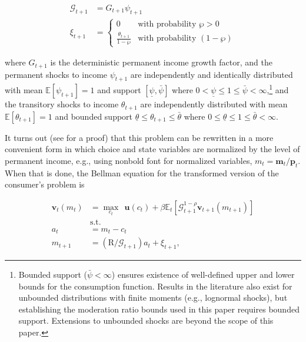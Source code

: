 \documentclass[twocolumn, switch]{article}
\newcommand{\Ex}{\mathbf{\mathbb{E}}}
\newcommand{\DiscFac}{\beta}
\newcommand{\uFunc}{\mathbf{u}}
\newcommand{\CRRA}{\rho}
\newcommand{\cNrm}{c}
\newcommand{\Rfree}{\text{R}}
\newcommand{\PermGroShk}{\mathcal{G}}
\newcommand{\tranShk}{\xi}
\newcommand{\mLvl}{\mathbf{m}}
\newcommand{\pLvl}{\mathbf{p}}
\newcommand{\PermGroFac}{G}
\newcommand{\permShk}{\psi}
\newcommand{\tranShkEmp}{\theta}
\newcommand{\WorstProb}{\wp}
\newcommand{\permShkMin}{\underline{\permShk}}
\newcommand{\permShkMax}{\bar{\permShk}}
\newcommand{\tranShkEmpMin}{\underline{\tranShkEmp}}
\newcommand{\tranShkEmpMax}{\bar{\tranShkEmp}}
\newcommand{\mNrm}{m}
\newcommand{\aNrm}{a}
\newcommand{\vFunc}{\mathbf{v}}
\begin{document}
\begin{equation}
\label{eq:ExogVars}
\begin{aligned}
\PermGroShk_{t+1} &= \PermGroFac_{t+1} \permShk_{t+1}  \\
\tranShk_{t+1} &= \begin{cases}
0 & \text{with probability } \WorstProb > 0 \\
\frac{\tranShkEmp_{t+1}}{1-\WorstProb} & \text{with probability } (1-\WorstProb)
\end{cases}
\end{aligned}
\end{equation}

where $\PermGroFac_{t+1}$ is the deterministic permanent income growth factor, and the permanent shocks to income $\permShk_{t+1}$ are independently and identically distributed with mean $\Ex[\permShk_{t+1}] = 1$ and support $[\permShkMin, \permShkMax]$ where $0 < \permShkMin \leq 1 \leq \permShkMax < \infty$,\footnote{Bounded support ($\permShkMax < \infty$) ensures existence of well-defined upper and lower bounds for the consumption function. Results in the literature also exist for unbounded distributions with finite moments (e.g., lognormal shocks), but establishing the moderation ratio bounds used in this paper requires bounded support. Extensions to unbounded shocks are beyond the scope of this paper.} and the transitory shocks to income $\tranShkEmp_{t+1}$ are independently distributed with mean $\Ex[\tranShkEmp_{t+1}] = 1$ and bounded support $\tranShkEmpMin \leq \tranShkEmp_{t+1} \leq \tranShkEmpMax$ where $0 \leq \tranShkEmpMin \leq 1 \leq \tranShkEmpMax < \infty$.

It turns out (see \citet{SolvingMicroDSOPs} for a proof) that this problem can
be rewritten in a more convenient form in which choice and state variables are
normalized by the level of permanent income, e.g., using nonbold font for normalized variables, $\mNrm_{t}=\mLvl_{t}/\pLvl_{t}$. When that is done, the
Bellman equation for the transformed version of the consumer's problem is

\begin{equation}
\label{eq:vNormed}
\begin{aligned}
\vFunc_{t}(\mNrm_{t}) &= \max_{\cNrm_{t}} ~~ \uFunc(\cNrm_{t})+\DiscFac \Ex_{t}[ \PermGroShk_{t+1}^{1-\CRRA}\vFunc_{t+1}(\mNrm_{t+1})] \\
&\text{s.t.} \\
\aNrm_{t} &= \mNrm_{t}-\cNrm_{t} \\
\mNrm_{t+1} &= \left(\Rfree/\PermGroShk_{t+1}\right)\aNrm_{t}+\tranShk_{t+1},
\end{aligned}
\end{equation}
\end{document}
